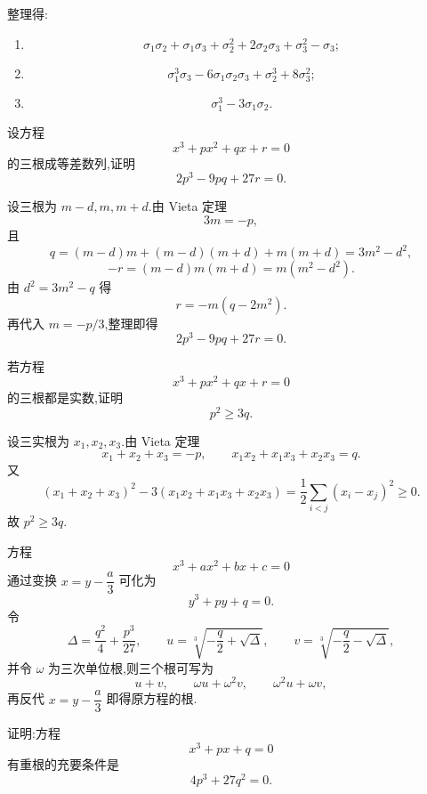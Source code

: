 \begin{solution}
整理得:
\begin{enumerate}
  \item
  \[
    \sigma_1\sigma_2+\sigma_1\sigma_3+\sigma_2^2
    +2\sigma_2\sigma_3+\sigma_3^2-\sigma_3;
  \]
  \item
  \[
    \sigma_1^3\sigma_3-6\sigma_1\sigma_2\sigma_3
    +\sigma_2^3+8\sigma_3^2;
  \]
  \item
  \[
    \sigma_1^3-3\sigma_1\sigma_2.
  \]
\end{enumerate}
\end{solution}

\begin{example}
设方程
\[
  x^3+px^2+qx+r=0
\]
的三根成等差数列,证明
\[
  2p^3-9pq+27r=0.
\]
\end{example}
\exampleblank

\begin{solution}
设三根为 $m-d,m,m+d$.由 Vieta 定理
\[
  3m=-p,
\]
且
\[
  q=(m-d)m+(m-d)(m+d)+m(m+d)=3m^2-d^2,
\]
\[
  -r=(m-d)m(m+d)=m(m^2-d^2).
\]
由 $d^2=3m^2-q$ 得
\[
  r=-m(q-2m^2).
\]
再代入 $m=-p/3$,整理即得
\[
  2p^3-9pq+27r=0.
\]
\end{solution}

\begin{example}
若方程
\[
  x^3+px^2+qx+r=0
\]
的三根都是实数,证明
\[
  p^2\ge3q.
\]
\end{example}
\exampleblank

\begin{solution}
设三实根为 $x_1,x_2,x_3$.由 Vieta 定理
\[
  x_1+x_2+x_3=-p,
  \qquad
  x_1x_2+x_1x_3+x_2x_3=q.
\]
又
\[
  (x_1+x_2+x_3)^2-3(x_1x_2+x_1x_3+x_2x_3)
  =\dfrac12\sum_{i<j}(x_i-x_j)^2\ge0.
\]
故 $p^2\ge3q$.
\end{solution}

\begin{proposition}
方程
\[
  x^3+ax^2+bx+c=0
\]
通过变换 $x=y-\dfrac a3$ 可化为
\[
  y^3+py+q=0.
\]
令
\[
  \Delta=\dfrac{q^2}{4}+\dfrac{p^3}{27},
  \qquad
  u=\sqrt[3]{-\dfrac q2+\sqrt\Delta},
  \qquad
  v=\sqrt[3]{-\dfrac q2-\sqrt\Delta},
\]
并令 $\omega$ 为三次单位根,则三个根可写为
\[
  u+v,
  \qquad
  \omega u+\omega^2v,
  \qquad
  \omega^2u+\omega v,
\]
再反代 $x=y-\dfrac a3$ 即得原方程的根.
\end{proposition}

\begin{example}[\markstar]
证明:方程
\[
  x^3+px+q=0
\]
有重根的充要条件是
\[
  4p^3+27q^2=0.
\]
\end{example}
\exampleblank

